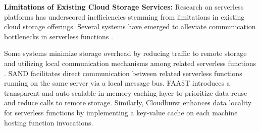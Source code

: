 


\textbf{Limitations of Existing Cloud Storage Services:} Research on serverless platforms has underscored inefficiencies stemming from limitations in existing cloud storage offerings. Several systems have emerged to alleviate communication bottlenecks in serverless functions \cite{jonas2019cloud,shillaker2020faasm,romero2021faat,akkus2018sand,klimovic2018pocket,Sreekanti_2020,wu2019autoscaling}.

Some systems minimize storage overhead by reducing traffic to remote storage and utilizing local communication mechanisms among related serverless functions \cite{akkus2018sand,romero2021faat}. SAND \cite{akkus2018sand} facilitates direct communication between related serverless functions running on the same server via a local message bus. FAA\$T \cite{romero2021faat} introduces a transparent and auto-scalable in-memory caching layer to prioritize data reuse and reduce calls to remote storage. Similarly, Cloudburst \cite{Sreekanti_2020} enhances data locality for serverless functions by implementing a key-value cache on each machine hosting function invocations.

